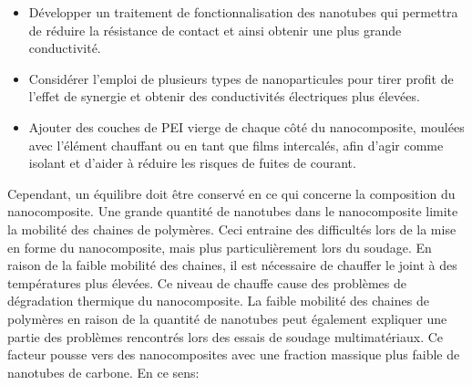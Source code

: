 \begin{itemize}
	\item Développer un traitement de fonctionnalisation des nanotubes qui permettra de réduire la résistance de contact et ainsi obtenir une plus grande conductivité.  
	\item Considérer l'emploi de plusieurs types de nanoparticules pour tirer profit de l'effet de synergie et obtenir des conductivités électriques plus élevées. 
	\item Ajouter des couches de PEI vierge de chaque côté du nanocomposite, moulées avec l'élément chauffant ou en tant que films intercalés, afin d'agir comme isolant et d'aider à réduire les risques de fuites de courant. 
\end{itemize}

Cependant, un équilibre doit être conservé en ce qui concerne la composition du nanocomposite. 
Une grande quantité de nanotubes dans le nanocomposite limite la mobilité des chaines de polymères. 
Ceci entraine des difficultés lors de la mise en forme du nanocomposite, mais plus particulièrement lors du soudage.
En raison de la faible mobilité des chaines, il est nécessaire de chauffer le joint à des températures plus élevées. 
Ce niveau de chauffe cause des problèmes de dégradation thermique du nanocomposite. 
La faible mobilité des chaines de polymères en raison de la quantité de nanotubes peut également expliquer une partie des problèmes rencontrés lors des essais de soudage multimatériaux. 
Ce facteur pousse vers des nanocomposites avec une fraction massique plus faible de nanotubes de carbone. 
En ce sens: 

